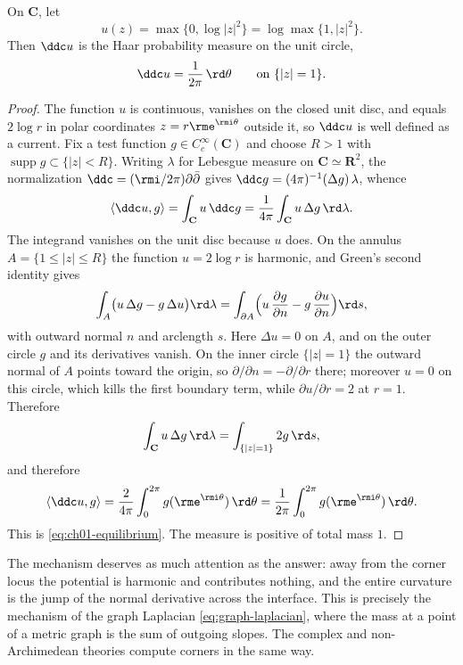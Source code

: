 \begin{lemma}\label{lem:ch01-equilibrium}
On $\mathbf C$, let
\[
   u(z)=\max\{0,\log|z|^2\}=\log\max\{1,|z|^2\}.
\]
Then $\ddc u$ is the Haar probability measure on the unit circle,
\begin{equation}\label{eq:ch01-equilibrium}
   \ddc u=\frac{1}{2\pi}\,\rd\theta
   \qquad\text{on }\{|z|=1\}.
\end{equation}
\end{lemma}
\begin{proof}
The function $u$ is continuous, vanishes on the closed unit disc, and equals
$2\log r$ in polar coordinates $z=r\rme^{\rmi\theta}$ outside it, so
$\ddc u$ is well defined as a current.  Fix a test function
$g\in C^\infty_c(\mathbf C)$ and choose $R>1$ with
$\operatorname{supp}g\subset\{|z|<R\}$.  Writing $\lambda$ for Lebesgue
measure on $\mathbf C\simeq\mathbf R^2$, the normalization
$\ddc=(\rmi/2\pi)\partial\bar\partial$ gives
$\ddc g=(4\pi)^{-1}(\Delta g)\,\lambda$, whence
\[
   \langle \ddc u,g\rangle
   =\int_{\mathbf C}u\,\ddc g
   =\frac{1}{4\pi}\int_{\mathbf C}u\,\Delta g\,\rd\lambda .
\]
The integrand vanishes on the unit disc because $u$ does.  On the annulus
$A=\{1\leq|z|\leq R\}$ the function $u=2\log r$ is harmonic, and Green's
second identity gives
\[
 \int_A\bigl(u\,\Delta g-g\,\Delta u\bigr)\rd\lambda
 =\int_{\partial A}\Bigl(u\,\frac{\partial g}{\partial n}
     -g\,\frac{\partial u}{\partial n}\Bigr)\rd s,
\]
with outward normal $n$ and arclength $s$.  Here $\Delta u=0$ on $A$, and on
the outer circle $g$ and its derivatives vanish.  On the inner circle
$\{|z|=1\}$ the outward normal of $A$ points toward the origin, so
$\partial/\partial n=-\partial/\partial r$ there; moreover $u=0$ on this
circle, which kills the first boundary term, while
$\partial u/\partial r=2$ at $r=1$.  Therefore
\[
 \int_{\mathbf C}u\,\Delta g\,\rd\lambda
 =\int_{\{|z|=1\}}2g\,\rd s ,
\]
and therefore
\[
 \langle \ddc u,g\rangle
 =\frac{2}{4\pi}\int_0^{2\pi}g(\rme^{\rmi\theta})\,\rd\theta
 =\frac{1}{2\pi}\int_0^{2\pi}g(\rme^{\rmi\theta})\,\rd\theta .
\]
This is \eqref{eq:ch01-equilibrium}.  The measure is positive of total mass
$1$.
\end{proof}

The mechanism deserves as much attention as the answer: away from the corner
locus the potential is harmonic and contributes nothing, and the entire
curvature is the jump of the normal derivative across the interface.  This
is precisely the mechanism of the graph Laplacian
\eqref{eq:graph-laplacian}, where the mass at a point of a metric graph is
the sum of outgoing slopes.  The complex and non-Archimedean theories
compute corners in the same way.

